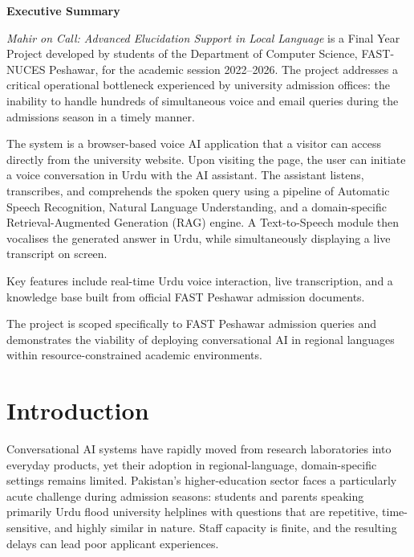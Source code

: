 \documentclass[12pt,a4paper]{report}
\begin{document}
\newpage
\thispagestyle{plain}
\begin{center}
  {\Large \textbf{Executive Summary}}\\[1cm]
\end{center}

\noindent \textit{Mahir on Call: Advanced Elucidation Support in Local
Language} is a Final Year Project developed by students of the Department of
Computer Science, FAST-NUCES Peshawar, for the academic session 2022--2026.
The project addresses a critical operational bottleneck experienced by
university admission offices: the inability to handle hundreds of simultaneous voice and email queries during the admissions season in a timely manner.

The system is a browser-based voice AI application that a visitor can access
directly from the university website. Upon visiting the page, the user can
initiate a voice conversation in Urdu with the AI assistant. The assistant
listens, transcribes, and comprehends the spoken query using a pipeline of
Automatic Speech Recognition, Natural Language Understanding, and
a domain-specific Retrieval-Augmented Generation (RAG) engine. A
Text-to-Speech module then vocalises the generated answer in Urdu, while
simultaneously displaying a live transcript on screen.

Key features include real-time Urdu voice interaction, live transcription, and a knowledge base built from official FAST Peshawar admission documents. 

The project is scoped specifically to FAST Peshawar admission queries and
demonstrates the viability of deploying conversational AI in regional
languages within resource-constrained academic environments.

\newpage
\tableofcontents

\newpage
{}
\setcounter{page}{1}

\newpage
\section{Introduction}

Conversational AI systems have rapidly moved from research laboratories into
everyday products, yet their adoption in regional-language, domain-specific
settings remains limited. Pakistan's higher-education sector faces a
particularly acute challenge during admission seasons: students and parents
speaking primarily Urdu flood university helplines with questions that are
repetitive, time-sensitive, and highly similar in nature. Staff capacity is
finite, and the resulting delays can lead poor applicant experiences.
\end{document}
